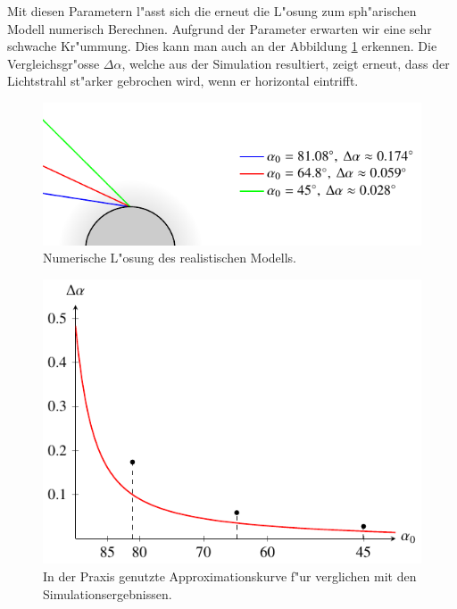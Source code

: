 \begin{refsection}
Mit diesen Parametern l"asst sich die erneut die L"osung zum sph"arischen Modell numerisch Berechnen. 
Aufgrund der Parameter erwarten wir eine sehr schwache Kr"ummung. 
Dies kann man auch an der Abbildung \ref{fig:sphere_real} erkennen. 
Die Vergleichsgr"osse $\Delta \alpha$, welche aus der Simulation resultiert, zeigt erneut, dass der Lichtstrahl st"arker gebrochen wird, wenn er horizontal eintrifft. 

\begin{figure}
  \centering
  \includegraphics[scale=1]{licht/standalone/fig_real_simulation.pdf}
  \caption{Numerische L"osung des realistischen Modells. \label{fig:sphere_real} } 
\end{figure}

\begin{figure}
  \centering
  \includegraphics[scale=1]{licht/standalone/fig_real_comparison.pdf}
  \caption{In der Praxis genutzte Approximationskurve f"ur verglichen mit den Simulationsergebnissen. \label{fig:real_comparison}}
\end{figure}

\printbibliography[heading=subbibliography]
\end{refsection}
